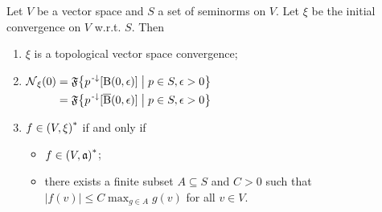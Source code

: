 \begin{proposition} \label{initialSeminormConvergence}
Let $V$ be a vector space and $S$ a set of seminorms on $V$. Let $\xi$ be the initial convergence on $V$ w.r.t. $S$. Then
\begin{enumerate}
\item $\xi$ is a topological vector space convergence;
\item $\begin{aligned}[t]
\neighbourhood_\xi(0) &= \mathfrak{F}\setbuilder{p^\preimf[\ball(0,\epsilon)]}{p\in S, \epsilon > 0} \\
&= \mathfrak{F}\setbuilder{p^\preimf[\cball(0,\epsilon)]}{p\in S, \epsilon > 0}
\end{aligned}$
\item $f\in \left( V, \xi \right)^*$ \textup{if and only if}
\begin{itemize}
\item $f\in \left( V,\mathfrak{a} \right)^*$;
\item there exists a finite subset $A\subseteq S$ and $C>0$ such that $|f(v)| \leq C\max_{g\in A} g(v)$ for all $v\in V$.
\end{itemize}
\end{enumerate}
\end{proposition}
